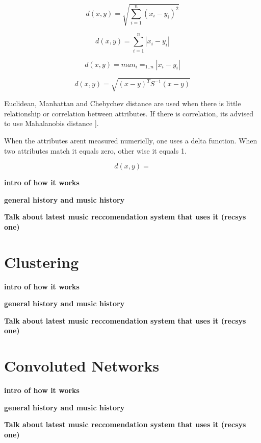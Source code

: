 \begin{equation}
	d(x,y) = \sqrt{\sum _{i=1} ^{n}(x_{i} - y_{i})^{2}}
\end{equation}

\begin{equation}
	d(x,y) = \sum _{i=1} ^{n} | x_{i} - y_{i} |
\end{equation}

\begin{equation}
	d(x,y) = man_{i} = _{1 . . n} | x_{i} - y_{i} |
\end{equation}

\begin{equation}
	d(x,y) = \sqrt{ ( x - y )^{ T } S^{ -1 } ( x - y ) }
\end{equation}

Euclidean, Manhattan and Chebychev distance are used when there is little relationship or correlation between attributes. If there is correlation, its advised to use Mahalanobis distance \citep{celma_recommendation_2010}].

When the attributes arent measured numericlly, one uses a delta function. When two attributes match it equals zero, other wise it equals 1.

\begin{equation}
	d(x,y) = 
\end{equation}


\textbf{intro of how it works}

\textbf{general history and music history}

\textbf{Talk about latest music reccomendation system that uses it (recsys one)}
\section{Clustering}
\textbf{intro of how it works}

\textbf{general history and music history}

\textbf{Talk about latest music reccomendation system that uses it (recsys one)}

\section{Convoluted Networks}
\textbf{intro of how it works}

\textbf{general history and music history}

\textbf{Talk about latest music reccomendation system that uses it (recsys one)}

